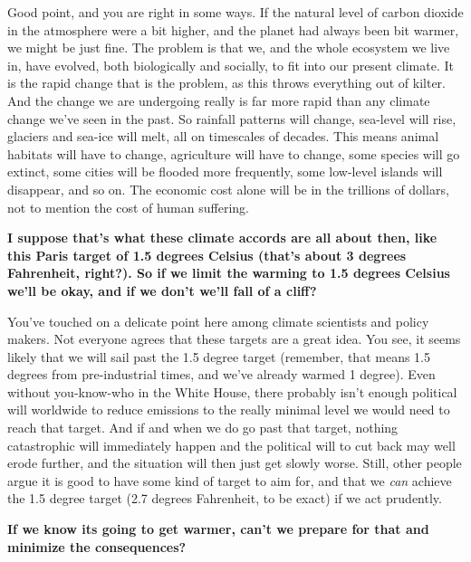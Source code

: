 \documentclass[11pt]{article}
\begin{document}
Good point, and you are right in some ways. If the natural level of
carbon dioxide in the atmosphere were a bit higher, and the planet had
always been bit warmer, we might be just fine. The problem is that we,
and the whole ecosystem we live in, have evolved, both biologically and
socially, to fit into our present climate. It is the rapid change that
is the problem, as this throws everything out of kilter. And the change
we are undergoing really is far more rapid than any climate change we've
seen in the past. So rainfall patterns will change, sea-level will rise,
glaciers and sea-ice will melt, all on timescales of decades. This means
animal habitats will have to change, agriculture will have to change,
some species will go extinct, some cities will be flooded more
frequently, some low-level islands will disappear, and so on. The
economic cost alone will be in the trillions of dollars, not to mention
the cost of human suffering.

\textbf{\color{navy} I suppose that's what these climate accords are all about then,
like this Paris target of 1.5 degrees Celsius (that's about 3 degrees Fahrenheit, right?). 
So if we limit the warming to 1.5 degrees Celsius we'll be okay, and if we don't we'll fall
of a cliff?}

You've touched on a delicate point here among climate scientists and
policy makers. Not everyone agrees that these targets are a great idea.
You see, it seems likely that we will sail past the 1.5 degree
target (remember, that means 1.5 degrees from pre-industrial times, and
we've already warmed 1 degree). Even without you-know-who in the White
House, there probably isn't enough political will worldwide to reduce
emissions to the really minimal level we would need to reach that
target. And if and when we do go past that target, nothing catastrophic will
immediately happen and the political will to cut back may well erode
further, and the situation will then just get slowly worse. Still, other
people argue it is good to have some kind of target to aim for, and
that we \textit{can} achieve the 1.5 degree target (2.7 degrees Fahrenheit, to be exact)
if we act prudently.

\textbf{\color{navy} If we know its going to get warmer, can't we prepare for that
and minimize the consequences?}
\end{document}
